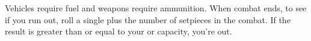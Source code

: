 
Vehicles require fuel and weapons require ammunition. When combat ends, to see if you run out, roll a single  plus the number of setpieces in the combat. If the result is greater than or equal to your  or  capacity, you're out. 